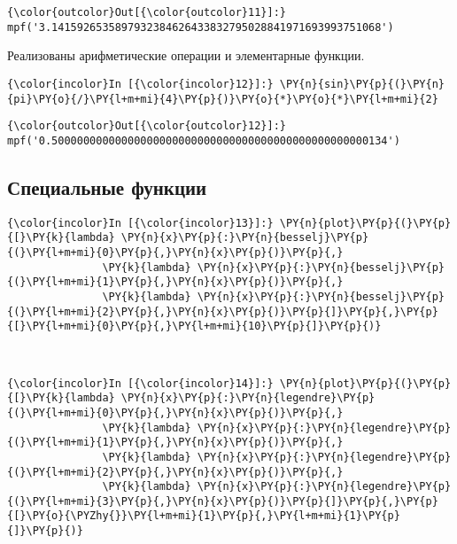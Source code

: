             \begin{Verbatim}[commandchars=\\\{\}]
{\color{outcolor}Out[{\color{outcolor}11}]:} mpf('3.1415926535897932384626433832795028841971693993751068')
\end{Verbatim}
        
    Реализованы арифметические операции и элементарные функции.

    \begin{Verbatim}[commandchars=\\\{\}]
{\color{incolor}In [{\color{incolor}12}]:} \PY{n}{sin}\PY{p}{(}\PY{n}{pi}\PY{o}{/}\PY{l+m+mi}{4}\PY{p}{)}\PY{o}{*}\PY{o}{*}\PY{l+m+mi}{2}
\end{Verbatim}

            \begin{Verbatim}[commandchars=\\\{\}]
{\color{outcolor}Out[{\color{outcolor}12}]:} mpf('0.50000000000000000000000000000000000000000000000000134')
\end{Verbatim}
        
\subsection{Специальные функции}
\label{mpmath2}

    \begin{Verbatim}[commandchars=\\\{\}]
{\color{incolor}In [{\color{incolor}13}]:} \PY{n}{plot}\PY{p}{(}\PY{p}{[}\PY{k}{lambda} \PY{n}{x}\PY{p}{:}\PY{n}{besselj}\PY{p}{(}\PY{l+m+mi}{0}\PY{p}{,}\PY{n}{x}\PY{p}{)}\PY{p}{,}
               \PY{k}{lambda} \PY{n}{x}\PY{p}{:}\PY{n}{besselj}\PY{p}{(}\PY{l+m+mi}{1}\PY{p}{,}\PY{n}{x}\PY{p}{)}\PY{p}{,}
               \PY{k}{lambda} \PY{n}{x}\PY{p}{:}\PY{n}{besselj}\PY{p}{(}\PY{l+m+mi}{2}\PY{p}{,}\PY{n}{x}\PY{p}{)}\PY{p}{]}\PY{p}{,}\PY{p}{[}\PY{l+m+mi}{0}\PY{p}{,}\PY{l+m+mi}{10}\PY{p}{]}\PY{p}{)}
\end{Verbatim}

    \begin{center}
    \end{center}
    { \hspace*{\fill} \\}
    
    \begin{Verbatim}[commandchars=\\\{\}]
{\color{incolor}In [{\color{incolor}14}]:} \PY{n}{plot}\PY{p}{(}\PY{p}{[}\PY{k}{lambda} \PY{n}{x}\PY{p}{:}\PY{n}{legendre}\PY{p}{(}\PY{l+m+mi}{0}\PY{p}{,}\PY{n}{x}\PY{p}{)}\PY{p}{,}
               \PY{k}{lambda} \PY{n}{x}\PY{p}{:}\PY{n}{legendre}\PY{p}{(}\PY{l+m+mi}{1}\PY{p}{,}\PY{n}{x}\PY{p}{)}\PY{p}{,}
               \PY{k}{lambda} \PY{n}{x}\PY{p}{:}\PY{n}{legendre}\PY{p}{(}\PY{l+m+mi}{2}\PY{p}{,}\PY{n}{x}\PY{p}{)}\PY{p}{,}
               \PY{k}{lambda} \PY{n}{x}\PY{p}{:}\PY{n}{legendre}\PY{p}{(}\PY{l+m+mi}{3}\PY{p}{,}\PY{n}{x}\PY{p}{)}\PY{p}{]}\PY{p}{,}\PY{p}{[}\PY{o}{\PYZhy{}}\PY{l+m+mi}{1}\PY{p}{,}\PY{l+m+mi}{1}\PY{p}{]}\PY{p}{)}
\end{Verbatim}

